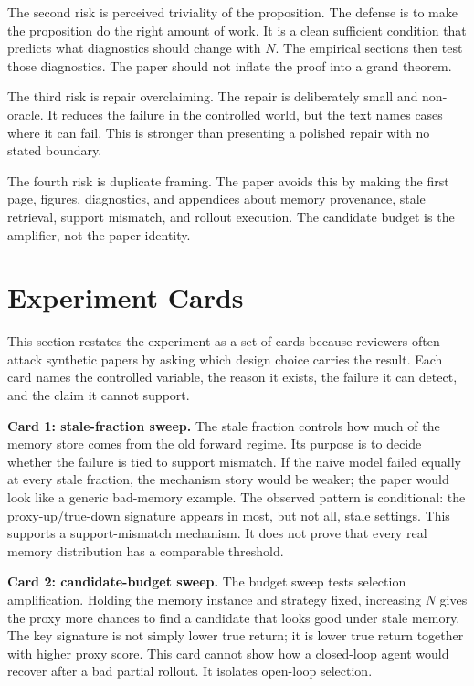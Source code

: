 \documentclass{article}
\begin{document}
The second risk is perceived triviality of the proposition. The defense is to
make the proposition do the right amount of work. It is a clean sufficient
condition that predicts what diagnostics should change with $N$. The empirical
sections then test those diagnostics. The paper should not inflate the proof
into a grand theorem.

The third risk is repair overclaiming. The repair is deliberately small and
non-oracle. It reduces the failure in the controlled world, but the text names
cases where it can fail. This is stronger than presenting a polished repair
with no stated boundary.

The fourth risk is duplicate framing. The paper avoids this by making the
first page, figures, diagnostics, and appendices about memory provenance,
stale retrieval, support mismatch, and rollout execution. The candidate budget
is the amplifier, not the paper identity.

\section{Experiment Cards}
\label{app:experiment-cards}

This section restates the experiment as a set of cards because reviewers often
attack synthetic papers by asking which design choice carries the result. Each
card names the controlled variable, the reason it exists, the failure it can
detect, and the claim it cannot support.

\textbf{Card 1: stale-fraction sweep.} The stale fraction controls how much of
the memory store comes from the old forward regime. Its purpose is to decide
whether the failure is tied to support mismatch. If the naive model failed
equally at every stale fraction, the mechanism story would be weaker; the
paper would look like a generic bad-memory example. The observed pattern is
conditional: the proxy-up/true-down signature appears in most, but not all,
stale settings. This supports a support-mismatch mechanism. It does not prove
that every real memory distribution has a comparable threshold.

\textbf{Card 2: candidate-budget sweep.} The budget sweep tests selection
amplification. Holding the memory instance and strategy fixed, increasing $N$
gives the proxy more chances to find a candidate that looks good under stale
memory. The key signature is not simply lower true return; it is lower true
return together with higher proxy score. This card cannot show how a closed-loop
agent would recover after a bad partial rollout. It isolates open-loop
selection.
\end{document}
